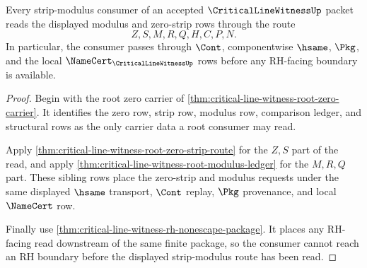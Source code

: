 \begin{theorem}
\label{thm:critical-line-witness-strip-modulus-readback}
Every strip-modulus consumer of an accepted $\CriticalLineWitnessUp$ packet reads the displayed modulus and zero-strip rows through the route
$$
Z,S,M,R,Q,H,C,P,N.
$$
In particular, the consumer passes through $\Cont$, componentwise $\hsame$, $\Pkg$, and the local $\NameCert_{\CriticalLineWitnessUp}$ rows before any RH-facing boundary is available.
\end{theorem}
\begin{proof}
Begin with the root zero carrier of \autoref{thm:critical-line-witness-root-zero-carrier}. It identifies the zero row, strip row, modulus row, comparison ledger, and structural rows as the only carrier data a root consumer may read.

Apply \autoref{thm:critical-line-witness-root-zero-strip-route} for the $Z,S$ part of the read, and apply \autoref{thm:critical-line-witness-root-modulus-ledger} for the $M,R,Q$ part. These sibling rows place the zero-strip and modulus requests under the same displayed $\hsame$ transport, $\Cont$ replay, $\Pkg$ provenance, and local $\NameCert$ row.

Finally use \autoref{thm:critical-line-witness-rh-nonescape-package}. It places any RH-facing read downstream of the same finite package, so the consumer cannot reach an RH boundary before the displayed strip-modulus route has been read.
\end{proof}

